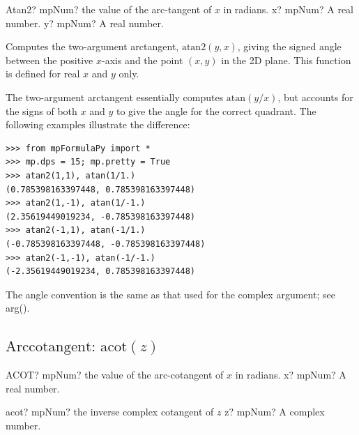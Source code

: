 \vspace{0.6cm}

\begin{mpFunctionsExtract}
	\mpFunctionTwo
	{Atan2? mpNum? the value of the arc-tangent of $x$ in radians.}
	{x? mpNum? A real number.}
	{y? mpNum? A real number.}
\end{mpFunctionsExtract}


\vspace{0.6cm}

Computes the two-argument arctangent, $\text{atan2}(y, x)$, giving the signed angle between the positive $x$-axis and the point $(x, y)$ in the 2D plane. This function is defined for real $x$ and $y$ only.

The two-argument arctangent essentially computes $\text{atan}(y/x)$, but accounts for the signs of both $x$ and $y$ to give the angle for the correct quadrant. The following examples illustrate the difference:


\begin{lstlisting}
>>> from mpFormulaPy import *
>>> mp.dps = 15; mp.pretty = True
>>> atan2(1,1), atan(1/1.)
(0.785398163397448, 0.785398163397448)
>>> atan2(1,-1), atan(1/-1.)
(2.35619449019234, -0.785398163397448)
>>> atan2(-1,1), atan(-1/1.)
(-0.785398163397448, -0.785398163397448)
>>> atan2(-1,-1), atan(-1/-1.)
(-2.35619449019234, 0.785398163397448)
\end{lstlisting}

The angle convention is the same as that used for the complex argument; see arg().





\newpage
\subsection{\texorpdfstring{$\text{Arccotangent: acot}(z)$}{acot}}
\label{inverse complex cotangent}

\begin{mpFunctionsExtract}
	\mpWorksheetFunctionOneNotImplemented
	{ACOT? mpNum? the value of the arc-cotangent of $x$ in radians.}
	{x? mpNum? A real number.}
\end{mpFunctionsExtract}

\vspace{0.6cm}


\begin{mpFunctionsExtract}
	\mpFunctionOne
	{acot? mpNum? the inverse complex cotangent of $z$}
	{z? mpNum? A complex number.}
\end{mpFunctionsExtract}

